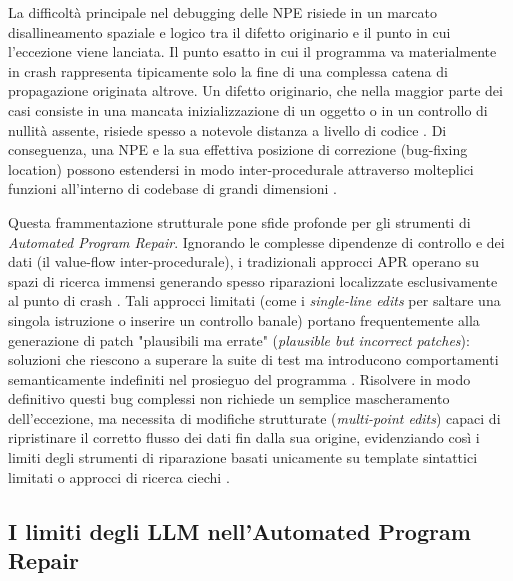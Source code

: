La difficoltà principale nel debugging delle NPE risiede in un marcato disallineamento spaziale 
e logico tra il difetto originario e il punto in cui l'eccezione viene lanciata. 
Il punto esatto in cui il programma va materialmente in crash rappresenta tipicamente solo la 
fine di una complessa catena di propagazione originata altrove. 
Un difetto originario, che nella maggior parte dei casi consiste in una mancata inizializzazione 
di un oggetto o in un controllo di nullità assente, risiede spesso a notevole distanza a livello 
di codice \cite{xu2019vfix}. Di conseguenza, una NPE e la sua effettiva posizione di correzione 
(bug-fixing location) possono estendersi in modo inter-procedurale attraverso molteplici funzioni 
all'interno di codebase di grandi dimensioni \cite{xu2019vfix}.

Questa frammentazione strutturale pone sfide profonde per gli strumenti di
 \textit{Automated Program Repair}. Ignorando le complesse dipendenze 
 di controllo e dei dati (il value-flow inter-procedurale), i tradizionali 
 approcci APR operano su spazi di ricerca immensi generando spesso riparazioni 
 localizzate esclusivamente al punto di crash \cite{xu2019vfix}. Tali approcci 
 limitati (come i \textit{single-line edits} per saltare una singola istruzione 
 o inserire un controllo banale) portano frequentemente alla generazione di patch 
 "plausibili ma errate" (\textit{plausible but incorrect patches}): soluzioni che 
 riescono a superare la suite di test ma introducono comportamenti semanticamente 
 indefiniti nel prosieguo del programma \cite{xu2019vfix}. Risolvere in modo definitivo
  questi bug complessi non richiede un semplice mascheramento dell'eccezione, ma necessita 
  di modifiche strutturate (\textit{multi-point edits}) capaci di ripristinare il 
  corretto flusso dei dati fin dalla sua origine, evidenziando così i limiti degli 
  strumenti di riparazione basati unicamente su template sintattici limitati o approcci 
  di ricerca ciechi \cite{xu2019vfix}.

\subsection{I limiti degli LLM nell'Automated Program Repair}

